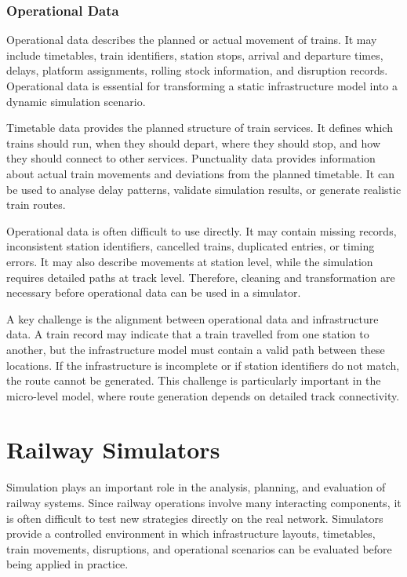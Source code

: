 \newpage

\subsubsection{Operational Data}
Operational data describes the planned or actual movement of trains. It may include timetables, train identifiers, station 
stops, arrival and departure times, delays, platform assignments, rolling stock information, and disruption records. 
Operational data is essential for transforming a static infrastructure model into a dynamic simulation scenario.

Timetable data provides the planned structure of train services. It defines which trains should run, when they should 
depart, where they should stop, and how they should connect to other services. Punctuality data provides information about 
actual train movements and deviations from the planned timetable. It can be used to analyse delay patterns, validate 
simulation results, or generate realistic train routes.

Operational data is often difficult to use directly. It may contain missing records, inconsistent station identifiers, 
cancelled trains, duplicated entries, or timing errors. It may also describe movements at station level, while the 
simulation requires detailed paths at track level. Therefore, cleaning and transformation are necessary before operational 
data can be used in a simulator.

A key challenge is the alignment between operational data and infrastructure data. A train record may indicate that a 
train travelled from one station to another, but the infrastructure model must contain a valid path between these 
locations. If the infrastructure is incomplete or if station identifiers do not match, the route cannot be generated. 
This challenge is particularly important in the micro-level model, where route generation depends on detailed track 
connectivity.

\section{Railway Simulators}
Simulation plays an important role in the analysis, planning, and evaluation of railway systems. Since railway operations 
involve many interacting components, it is often difficult to test new strategies directly on the real network. Simulators 
provide a controlled environment in which infrastructure layouts, timetables, train movements, disruptions, and operational 
scenarios can be evaluated before being applied in practice.

